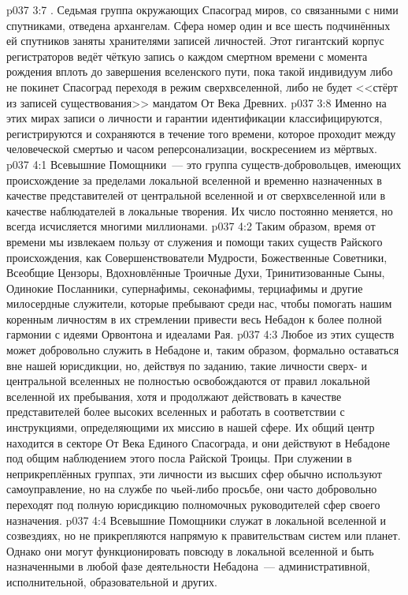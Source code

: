 \vs p037 3:7 \pc {}. Седьмая группа окружающих Спасоград миров, со связанными с ними спутниками, отведена архангелам. Сфера номер один и все шесть подчинённых ей спутников заняты хранителями записей личностей. Этот гигантский корпус регистраторов ведёт чёткую запись о каждом смертном времени с момента рождения вплоть до завершения вселенского пути, пока такой индивидуум либо не покинет Спасоград переходя в режим сверхвселенной, либо не будет <<стёрт из записей существования>> мандатом От Века Древних.
\vs p037 3:8 Именно на этих мирах записи о личности и гарантии идентификации классифицируются, регистрируются и сохраняются в течение того времени, которое проходит между человеческой смертью и часом реперсонализации, воскресением из мёртвых.
\vs p037 4:1 Всевышние Помощники~--- это группа существ\hyp{}добровольцев, имеющих происхождение за пределами локальной вселенной и временно назначенных в качестве представителей от центральной вселенной и от сверхвселенной или в качестве наблюдателей в локальные творения. Их число постоянно меняется, но всегда исчисляется многими миллионами.
\vs p037 4:2 Таким образом, время от времени мы извлекаем пользу от служения и помощи таких существ Райского происхождения, как Совершенствователи Мудрости, Божественные Советники, Всеобщие Цензоры, Вдохновлённые Троичные Духи, Тринитизованные Сыны, Одинокие Посланники, супернафимы, секонафимы, терциафимы и другие милосердные служители, которые пребывают среди нас, чтобы помогать нашим коренным личностям в их стремлении привести весь Небадон к более полной гармонии с идеями Орвонтона и идеалами Рая.
\vs p037 4:3 Любое из этих существ может добровольно служить в Небадоне и, таким образом, формально оставаться вне нашей юрисдикции, но, действуя по заданию, такие личности сверх- и центральной вселенных не полностью освобождаются от правил локальной вселенной их пребывания, хотя и продолжают действовать в качестве представителей более высоких вселенных и работать в соответствии с инструкциями, определяющими их миссию в нашей сфере. Их общий центр находится в секторе От Века Единого Спасограда, и они действуют в Небадоне под общим наблюдением этого посла Райской Троицы. При служении в неприкреплённых группах, эти личности из высших сфер обычно используют самоуправление, но на службе по чьей\hyp{}либо просьбе, они часто добровольно переходят под полную юрисдикцию полномочных руководителей сфер своего назначения.
\vs p037 4:4 Всевышние Помощники служат в локальной вселенной и созвездиях, но не прикрепляются напрямую к правительствам систем или планет. Однако они могут функционировать повсюду в локальной вселенной и быть назначенными в любой фазе деятельности Небадона~--- административной, исполнительной, образовательной и других.
